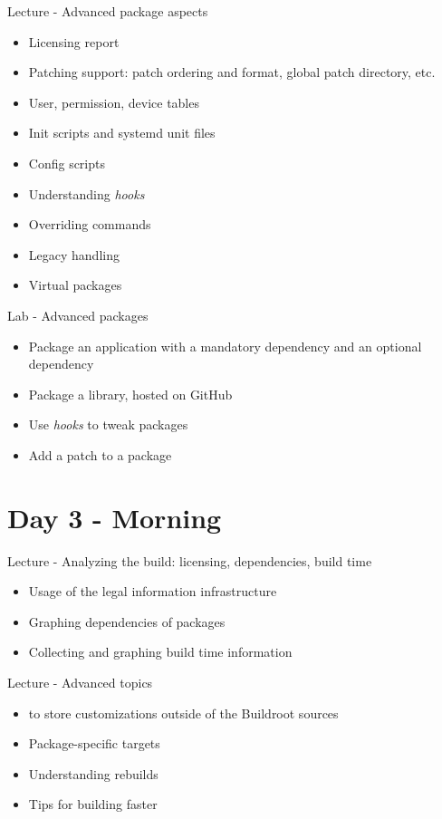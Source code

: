 \documentclass[a4paper,12pt,obeyspaces,spaces,hyphens]{article}
\begin{document}
\feagendatwocolumn
{Lecture - Advanced package aspects}
{
  \begin{itemize}
  \item Licensing report
  \item Patching support: patch ordering and format, global patch directory, etc.
  \item User, permission, device tables
  \item Init scripts and systemd unit files
  \item Config scripts
  \item Understanding {\em hooks}
  \item Overriding commands
  \item Legacy handling
  \item Virtual packages
  \end{itemize}
}
{Lab - Advanced packages}
{
  \begin{itemize}
  \item Package an application with a mandatory dependency and an
    optional dependency
  \item Package a library, hosted on GitHub
  \item Use {\em hooks} to tweak packages
  \item Add a patch to a package
  \end{itemize}
}

\section{Day 3 - Morning}

\feagendatwocolumn
{Lecture - Analyzing the build: licensing, dependencies, build time}
{
  \begin{itemize}
  \item Usage of the legal information infrastructure
  \item Graphing dependencies of packages
  \item Collecting and graphing build time information
  \end{itemize}
}
{Lecture - Advanced topics}
{
  \begin{itemize}
  \item {} to store customizations outside of the
    Buildroot sources
  \item Package-specific targets
  \item Understanding rebuilds
  \item Tips for building faster
  \end{itemize}
}
\end{document}
